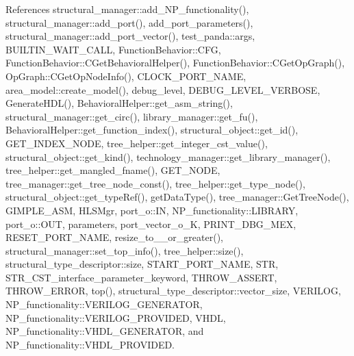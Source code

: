 References structural\+\_\+manager\+::add\+\_\+\+N\+P\+\_\+functionality(), structural\+\_\+manager\+::add\+\_\+port(), add\+\_\+port\+\_\+parameters(), structural\+\_\+manager\+::add\+\_\+port\+\_\+vector(), test\+\_\+panda\+::args, B\+U\+I\+L\+T\+I\+N\+\_\+\+W\+A\+I\+T\+\_\+\+C\+A\+LL, Function\+Behavior\+::\+C\+FG, Function\+Behavior\+::\+C\+Get\+Behavioral\+Helper(), Function\+Behavior\+::\+C\+Get\+Op\+Graph(), Op\+Graph\+::\+C\+Get\+Op\+Node\+Info(), C\+L\+O\+C\+K\+\_\+\+P\+O\+R\+T\+\_\+\+N\+A\+ME, area\+\_\+model\+::create\+\_\+model(), debug\+\_\+level, D\+E\+B\+U\+G\+\_\+\+L\+E\+V\+E\+L\+\_\+\+V\+E\+R\+B\+O\+SE, Generate\+H\+D\+L(), Behavioral\+Helper\+::get\+\_\+asm\+\_\+string(), structural\+\_\+manager\+::get\+\_\+circ(), library\+\_\+manager\+::get\+\_\+fu(), Behavioral\+Helper\+::get\+\_\+function\+\_\+index(), structural\+\_\+object\+::get\+\_\+id(), G\+E\+T\+\_\+\+I\+N\+D\+E\+X\+\_\+\+N\+O\+DE, tree\+\_\+helper\+::get\+\_\+integer\+\_\+cst\+\_\+value(), structural\+\_\+object\+::get\+\_\+kind(), technology\+\_\+manager\+::get\+\_\+library\+\_\+manager(), tree\+\_\+helper\+::get\+\_\+mangled\+\_\+fname(), G\+E\+T\+\_\+\+N\+O\+DE, tree\+\_\+manager\+::get\+\_\+tree\+\_\+node\+\_\+const(), tree\+\_\+helper\+::get\+\_\+type\+\_\+node(), structural\+\_\+object\+::get\+\_\+type\+Ref(), get\+Data\+Type(), tree\+\_\+manager\+::\+Get\+Tree\+Node(), G\+I\+M\+P\+L\+E\+\_\+\+A\+SM, H\+L\+S\+Mgr, port\+\_\+o\+::\+IN, N\+P\+\_\+functionality\+::\+L\+I\+B\+R\+A\+RY, port\+\_\+o\+::\+O\+UT, parameters, port\+\_\+vector\+\_\+o\+\_\+K, P\+R\+I\+N\+T\+\_\+\+D\+B\+G\+\_\+\+M\+EX, R\+E\+S\+E\+T\+\_\+\+P\+O\+R\+T\+\_\+\+N\+A\+ME, resize\+\_\+to\+\_\+\_\+or\+\_\+greater(), structural\+\_\+manager\+::set\+\_\+top\+\_\+info(), tree\+\_\+helper\+::size(), structural\+\_\+type\+\_\+descriptor\+::size, S\+T\+A\+R\+T\+\_\+\+P\+O\+R\+T\+\_\+\+N\+A\+ME, S\+TR, S\+T\+R\+\_\+\+C\+S\+T\+\_\+interface\+\_\+parameter\+\_\+keyword, T\+H\+R\+O\+W\+\_\+\+A\+S\+S\+E\+RT, T\+H\+R\+O\+W\+\_\+\+E\+R\+R\+OR, top(), structural\+\_\+type\+\_\+descriptor\+::vector\+\_\+size, V\+E\+R\+I\+L\+OG, N\+P\+\_\+functionality\+::\+V\+E\+R\+I\+L\+O\+G\+\_\+\+G\+E\+N\+E\+R\+A\+T\+OR, N\+P\+\_\+functionality\+::\+V\+E\+R\+I\+L\+O\+G\+\_\+\+P\+R\+O\+V\+I\+D\+ED, V\+H\+DL, N\+P\+\_\+functionality\+::\+V\+H\+D\+L\+\_\+\+G\+E\+N\+E\+R\+A\+T\+OR, and N\+P\+\_\+functionality\+::\+V\+H\+D\+L\+\_\+\+P\+R\+O\+V\+I\+D\+ED.

